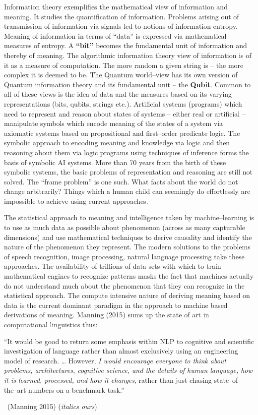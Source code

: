 Information theory exemplifies the mathematical view of information and meaning. It studies the quantification of information. Problems arising out of transmission of information via signals led to notions of information entropy. Meaning of information in terms of “data” is expressed via mathematical measures of entropy. A \textbf{“bit”} becomes the fundamental unit of information and thereby of meaning. The algorithmic information theory view of information is of it as a measure of computation. The more random a given string is – the more complex it is deemed to be. The Quantum world–view has its own version of Quantum information theory and its fundamental unit – the \textbf{Qubit}. Common to all of these views is the idea of data and the measures based on its varying representations (bits, qubits, strings etc.). Artificial systems (programs) which need to represent and reason about states of systems – either real or artificial – manipulate symbols which encode meaning of the states of a system via axiomatic systems based on propositional and first–order predicate logic. The symbolic approach to encoding meaning and knowledge via logic and then reasoning about them via logic programs using techniques of inference forms the basis of symbolic AI systems. More than 70 years from the birth of these symbolic systems, the basic problems of representation and reasoning are still not solved. The “frame problem” is one such. What facts about the world do not change arbitrarily? Things which a human child can seemingly do effortlessly are impossible to achieve using current approaches.

The statistical approach to meaning and intelligence taken by machine–learning is to use as much data as possible about phenomenon (across as many capturable dimensions) and use mathematical techniques to derive causality and identify the nature of the phenomenon they represent. The modern solutions to the problems of speech recognition, image processing, natural language processing take these approaches. The availability of trillions of data sets with which to train mathematical engines to recognize patterns masks the fact that machines actually do not understand much about the phenomenon that they can recognize in the statistical approach. The compute intensive nature of deriving meaning based on data is the current dominant paradigm in the approach to machine based derivations of meaning. Manning (2015) sums up the state of art in computational linguistics thus:

\begin{myquote}
“It would be good to return some emphasis within NLP to cognitive and scientific investigation of language rather than almost exclusively using an engineering model of research. … However, \textit{I would encourage everyone to think about problems, architectures, cognitive science, and the details of human language, how it is learned, processed, and how it changes}, rather than just chasing state–of–the–art numbers on a benchmark task.” 

~\hfill (Manning 2015) (\textit{italics ours})
\end{myquote}

